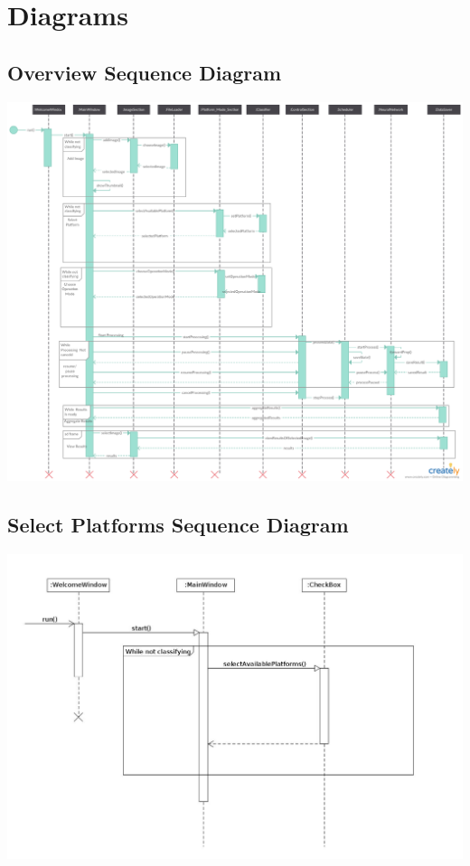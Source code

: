 \documentclass[parskip=full]{scrartcl}
\begin{document}
\pagebreak



\section {Diagrams}

\subsection {Overview Sequence Diagram}

\begin{center}
\includegraphics[width=1.0\textwidth]{seq-Diag.png}
\end{center}

\pagebreak

\subsection {Select Platforms Sequence Diagram}

\begin{center}
\includegraphics[width=1.0\textwidth]{SelectPlatforms.jpg}
\end{center}
\end{document}
